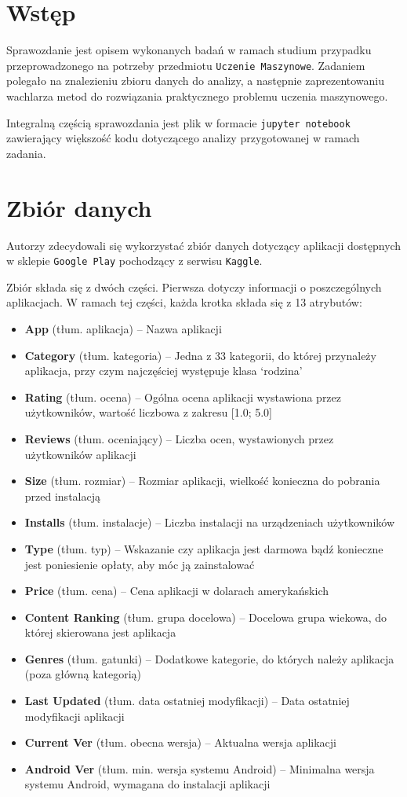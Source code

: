 \documentclass{article}
\begin{document}


\section{Wstęp}
Sprawozdanie jest opisem wykonanych badań w ramach studium przypadku przeprowadzonego na potrzeby przedmiotu \texttt{Uczenie Maszynowe}. Zadaniem polegało na znalezieniu zbioru danych do analizy, a następnie zaprezentowaniu wachlarza metod do rozwiązania praktycznego problemu uczenia maszynowego.

Integralną częścią sprawozdania jest plik w formacie \texttt{jupyter notebook} zawierający większość kodu dotyczącego analizy przygotowanej w ramach zadania.

\section{Zbiór danych}
Autorzy zdecydowali się wykorzystać zbiór danych dotyczący aplikacji dostępnych w sklepie \texttt{Google Play} pochodzący z serwisu \texttt{Kaggle}\cite{KaggleSite}.

Zbiór składa się z dwóch części. Pierwsza dotyczy informacji o poszczególnych aplikacjach. W ramach tej części, każda krotka składa się z 13 atrybutów:
\begin{itemize}
\item \textbf{App} (tłum. aplikacja) -- Nazwa aplikacji
\item \textbf{Category} (tłum. kategoria) -- Jedna z 33 kategorii, do której przynależy aplikacja, przy czym najczęściej występuje klasa `rodzina'
\item \textbf{Rating} (tłum. ocena) -- Ogólna ocena aplikacji wystawiona przez użytkowników, wartość liczbowa z zakresu [1.0; 5.0]
\item \textbf{Reviews} (tłum. oceniający) -- Liczba ocen, wystawionych przez użytkowników aplikacji
\item \textbf{Size} (tłum. rozmiar) -- Rozmiar aplikacji, wielkość konieczna do pobrania przed instalacją
\item \textbf{Installs} (tłum. instalacje) -- Liczba instalacji na urządzeniach użytkowników
\item \textbf{Type} (tłum. typ) -- Wskazanie czy aplikacja jest darmowa bądź konieczne jest poniesienie opłaty, aby móc ją zainstalować
\item \textbf{Price} (tłum. cena) -- Cena aplikacji w dolarach amerykańskich
\item \textbf{Content Ranking} (tłum. grupa docelowa) -- Docelowa grupa wiekowa, do której skierowana jest aplikacja
\item \textbf{Genres} (tłum. gatunki) -- Dodatkowe kategorie, do których należy aplikacja (poza główną kategorią)
\item \textbf{Last Updated} (tłum. data ostatniej modyfikacji) -- Data ostatniej modyfikacji aplikacji
\item \textbf{Current Ver} (tłum. obecna wersja) -- Aktualna wersja aplikacji
\item \textbf{Android Ver} (tłum. min. wersja systemu Android) -- Minimalna wersja systemu Android, wymagana do instalacji aplikacji
\end{itemize}
\end{document}
